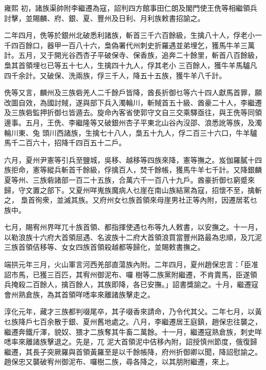 \begin{pinyinscope}
 雍熙
 初，諸族渠帥附李繼遷為寇，詔判四方館事田仁朗及閣門使王侁等相繼領兵討擊，並賜麟、府、銀、夏、豐州及日利、月利族敕書招諭之。



 二年四月，侁等於銀州北破悉利諸族，斬首三千六百餘級，生擒八十人，俘老小一千四百餘口，器甲一百八十六，梟偽署代州刺史折羅遇並弟埋乞，獲馬牛羊三萬計。五月，又于開光谷西杏子平破保寺、保香族，追奔二十餘里，斬首八百餘級，梟其首領埋乜已等五十七人，生擒四十九人，俘其老小
 三百餘人，獲牛羊馬驢凡四千余計。又破保、洗兩族，俘三千人，降五十五族，獲牛羊八千計。



 侁等又言，麟州及三族砦羌人二千餘戶皆降，酋長折御乜等六十四人獻馬首罪，願改圖自效，為國討賊，遂與部下兵入濁輪川，斬賊首五十級、酋豪二十人，李繼遷及三族砦監押折御乜皆遁去。旋命內客省使郭守文自三交乘驛亟往，與王侁等同領邊事。五月，王侁、李繼隆等又破銀州杏子平東北山谷內沒邵、浪悉訛等族，及濁輪川東、兔
 頭川西諸族，生擒七十八人，梟五十九人，俘二百三十六口，牛羊驢馬千二百六十，招降千四百五十二戶。



 六月，夏州尹憲等引兵至鹽城，吳移、越移等四族來降，憲等撫之。岌伽羅膩十四族拒命，憲等縱兵斬首千餘級，俘擒百人，焚千餘帳，獲馬牛羊七千計。又降銀麟夏等州、三族砦諸部一百二十五族，合萬六千一百八十九戶。酋豪折御乜窮蹙來歸，守文置之部下。又夏州咩嵬族魔病人乜崖在南山族結黨為寇，招懷不至，擒斬之，
 梟首徇衆，並滅其族。又府州女乜族首領來母崖男社正等內附，因遷居茗乜族中。



 七月，賜宥州界咩兀十族首領、都指揮使遇乜布等九人敕書，以安撫之。十一月，以勒浪族十六府大首領屈遇、名波族十二府大首領浪買當豐州路最為忠順，及兀泥三族首領佶移等、女女四族首領殺越都等歸化，並賜敕書撫之。



 端拱元年三月，火山軍言河西羌部直蕩族內附。二年四月，夏州趙保忠言：「臣准詔市馬，已獲三百匹，其宥州御泥布、囉
 樹等二族黨附繼遷，不肯賣馬，臣遂領兵掩殺二百餘人，擒百餘人，其族即降，各已安撫。」詔書獎諭之。十月，繼遷寇會州熟倉族，為其首領咩㗭率來離諸族擊走之。



 淳化元年，藏才三族都判啜尾卒，其子啜香來請命，乃令代其父。二年七月，以黃乜族降戶七百余散于銀、夏州舊地處之。八月，李繼遷居王庭鎮，趙保忠往襲之，繼遷奔鐵斤澤，貌奴、猥才二族奪其牛畜二萬餘。十一月，繼遷寇熟倉族，刺史咩㗭率來離諸族擊退之。先是，兀
 泥大首領泥中佶移內附，詔授慎州節度，俄復歸繼遷，其長子突厥羅與首領黃羅至是以千餘帳降，府州折御卿以聞，降詔慰諭之。趙保忠又襲破宥州御泥布、囉樹二族，尋各降之，以其朋附繼遷，來上。




\end{pinyinscope}
